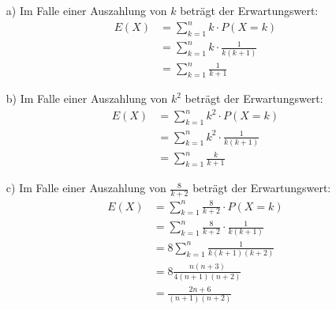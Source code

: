 \begin{enumerate}
	\item[a)] Im Falle einer Auszahlung von $k$ beträgt der Erwartungswert:
		\begin{equation*}
			\begin{split}
				E(X) 	&= \sum_{k=1}^{n} k \cdot P(X = k)\\
						&= \sum_{k=1}^{n} k \cdot \frac{1}{k(k+1)}\\
						&= \sum_{k=1}^{n}\frac{1}{k+1}
			\end{split}
		\end{equation*}
	\item[b)] Im Falle einer Auszahlung von $k^2$ beträgt der Erwartungswert:
				\begin{equation*}
					\begin{split}
						E(X) 	&= \sum_{k=1}^{n} k^2 \cdot P(X = k)\\
								&= \sum_{k=1}^{n} k^2 \cdot \frac{1}{k(k+1)}\\
								&= \sum_{k=1}^{n}\frac{k}{k+1}
					\end{split}
				\end{equation*}
	\item[c)] Im Falle einer Auszahlung von $\frac{8}{k+2}$ beträgt der Erwartungswert:
				\begin{equation*}
					\begin{split}
						E(X) 	&= \sum_{k=1}^{n} \frac{8}{k+2} \cdot P(X = k)\\
								&= \sum_{k=1}^{n} \frac{8}{k+2} \cdot \frac{1}{k(k+1)}\\
								&= 8 \sum_{k=1}^{n}\frac{1}{k(k+1)(k+2)}\\
								&= 8 \frac{n(n+3)}{4(n+1)(n+2)}\\
								&= \frac{2n+6}{(n+1)(n+2)}
					\end{split}
				\end{equation*}
\end{enumerate}